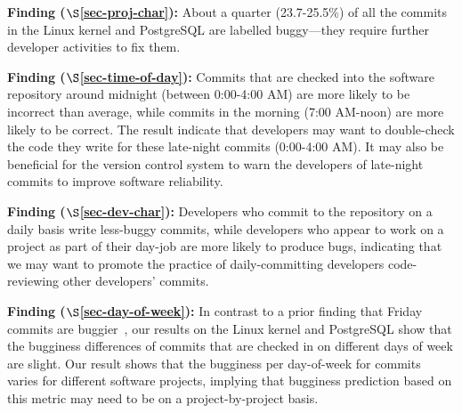 \begin{list}{}{\topsep=0pt\parsep=0pt\leftmargin=9pt\itemindent=0pt}

\item {\bf Finding \fbuggy ($\S$\ref{sec-proj-char}):} 
About a quarter (23.7-25.5\%) of all the commits in the Linux kernel and
PostgreSQL are labelled buggy---they require further developer activities to fix
them.

\item {\bf Finding \fhour ($\S$\ref{sec-time-of-day}):} 
Commits that are checked into the software repository around midnight (between
0:00-4:00 AM) are more likely to be incorrect than average, while commits in the
morning (7:00 AM-noon) are more likely to be correct.  The result indicate that
developers may want to double-check the code they write for these late-night
commits (0:00-4:00 AM).  It may also be beneficial for the version control
system to warn the developers of late-night commits to improve software
reliability.

\item {\bf Finding \fdaily ($\S$\ref{sec-dev-char}):} 
Developers who commit to the repository on a daily basis write less-buggy
commits, while developers who appear to work on a project as part of their
day-job are more likely to produce bugs, indicating that we may want to promote
the practice of daily-committing developers code-reviewing other developers'
commits.

\item {\bf Finding \fday ($\S$\ref{sec-day-of-week}):} 
In contrast to a prior finding that Friday commits are
buggier~\cite{sliwerski-msr-2005}, our results on the Linux kernel and
PostgreSQL show that the bugginess differences of commits that are checked in on
different days of week are slight. Our result shows that the bugginess per
day-of-week for commits varies for different software projects, implying that
bugginess prediction based on this metric may need to be on a project-by-project
basis.

\end{list}
